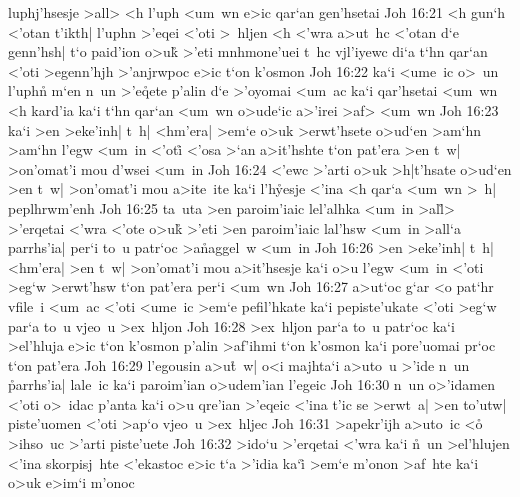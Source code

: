 luphj'hsesje
>all>
<h
l'uph
<um~wn
e>ic
qar`an
gen'hsetai\bibvsend
\vs Joh 16:21
<h
gun`h
<'otan
t'ikth|
l'uphn
>'eqei
<'oti
>~hljen
<h
<'wra
a>ut~hc
<'otan
d`e
genn'hsh|
t`o
paid'ion
o>uk\r{}
>'eti
mnhmone'uei
t~hc
vjl'iyewc
di`a
t`hn
qar`an
<'oti
>egenn'hjh
>'anjrwpoc
e>ic
t`on
k'osmon\bibvsend
\vs Joh 16:22
ka`i
<ume~ic
o>~un
l'uphn\r{}
m`en
n~un
>'e\r{q}ete
p'alin
d`e
>'oyomai
<um~ac
ka`i
qar'hsetai
<um~wn
<h
kard'ia
ka`i
t`hn
qar`an
<um~wn
o>ude`ic
a>'irei
>af>
<um~wn\bibvsend
\vs Joh 16:23
ka`i
>en
>eke'inh|
t~h|
<hm'era|
>em`e
o>uk
>erwt'hsete
o>ud`en
>am`hn
>am`hn
l'egw
<um~in
<'oti\r{}
<'osa
>`an
a>it'hshte
t`on
pat'era
>en
t~w|
>on'omat'i
mou
d'wsei
<um~in\bibvsend
\vs Joh 16:24
<'ewc
>'arti
o>uk
>h|t'hsate
o>ud`en
>en
t~w|
>on'omat'i
mou
a>ite~ite
ka`i
l'h\r{y}esje
<'ina
<h
qar`a
<um~wn
>~h|
peplhrwm'enh\bibvsend
\vs Joh 16:25
ta~uta
>en
paroim'iaic
lel'alhka
<um~in
>al\r{l}>
>'erqetai
<'wra
<'ote
o>uk\r{}
>'eti
>en
paroim'iaic
lal'hsw
<um~in
>all`a
parrhs'ia|
per`i
to~u
patr`oc
>a\r{n}aggel~w
<um~in\bibvsend
\vs Joh 16:26
>en
>eke'inh|
t~h|
<hm'era|
>en
t~w|
>on'omat'i
mou
a>it'hsesje
ka`i
o>u
l'egw
<um~in
<'oti
>eg`w
>erwt'hsw
t`on
pat'era
per`i
<um~wn\bibvsend
\vs Joh 16:27
a>ut`oc
g`ar
<o
pat`hr
vfile~i
<um~ac
<'oti
<ume~ic
>em`e
pefil'hkate
ka`i
pepiste'ukate
<'oti
>eg`w
par`a
to~u
vjeo~u
>ex~hljon\bibvsend
\vs Joh 16:28
>ex~hljon
par`a
to~u
patr`oc
ka`i
>el'hluja
e>ic
t`on
k'osmon
p'alin
>af'ihmi
t`on
k'osmon
ka`i
pore'uomai
pr`oc
t`on
pat'era\bibvsend
\vs Joh 16:29
l'egousin
a>u\r{t}~w|
o<i
majhta`i
a>uto~u
>'ide
n~un
\r{p}arrhs'ia|
lale~ic
ka`i
paroim'ian
o>udem'ian
l'egeic\bibvsend
\vs Joh 16:30
n~un
o>'idamen
<'oti
o>~idac
p'anta
ka`i
o>u
qre'ian
>'eqeic
<'ina
t'ic
se
>erwt~a|
>en
to'utw|
piste'uomen
<'oti
>ap`o
vjeo~u
>ex~hljec\bibvsend
\vs Joh 16:31
>apekr'ijh
a>uto~ic
<o\r{}
>ihso~uc
>'arti
piste'uete\bibvsend
\vs Joh 16:32
>ido`u
>'erqetai
<'wra
ka`i
\r{n}~un
>el'hlujen
<'ina
skorpisj~hte
<'ekastoc
e>ic
t`a
>'idia
ka`i\r{}
>em`e
m'onon
>af~hte
ka`i
o>uk
e>im`i
m'onoc
